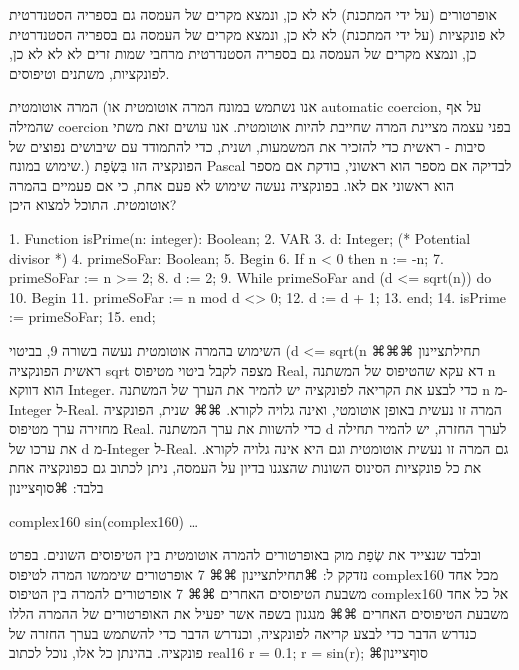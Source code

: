       אופרטורים
      (על ידי המתכנת)
      לא
      לא
      כן, ונמצא מקרים של העמסה גם בספריה הסטנדרטית
      לא
      פונקציות
      (על ידי המתכנת)
      לא
      לא
      כן, ונמצא מקרים של העמסה גם בספריה הסטנדרטית
      כן, ונמצא מקרים של העמסה גם בספריה הסטנדרטית
      מרחבי שמות זרים
      לא
      לא
      לא
      כן, לפונקציות, משתנים וטיפוסים.

      המרה אוטומטית
      (אנו נשתמש במונח המרה אוטומטית או automatic coercion, על אף שהמילה coercion בפני עצמה מציינת המרה שחייבת להיות אוטומטית. אנו עושים זאת משתי סיבות - ראשית כדי להזכיר את המשמעות, ושנית, כדי להתמודד עם שיבושים נפוצים של שימוש במונח.)
      הפונקציה הזו בִּשְׂפַת Pascal לבדיקה אם מספר הוא ראשוני, בודקת אם מספר הוא ראשוני אם לאו. בפונקציה נעשה שימוש לא פעם אחת, כי אם פעמיים בהמרה אוטומטית. התוכל למצוא היכן?

      1. Function isPrime(n: integer): Boolean;
      2. VAR
      3. d: Integer; (* Potential divisor *)
      4. primeSoFar: Boolean;
      5. Begin
      6. If n < 0 then n := -n;
      7. primeSoFar := n >= 2;
      8. d := 2;
      9. While primeSoFar and (d <= sqrt(n)) do
      10. Begin
      11. primeSoFar := n mod d <> 0;
      12. d := d + 1;
      13. end;
      14. isPrime := primeSoFar;
      15. end;

      השימוש בהמרה אוטומטית נעשה בשורה 9, בביטוי
      (d <= sqrt(n
      ⌘תחילת{ציינון}
      ⌘⌘ ראשית הפונקציה sqrt מצפה לקבל ביטוי מטיפוס Real, דא עקא שהטיפוס של המשתנה n הוא דווקא Integer. כדי לבצע את הקריאה לפונקציה יש להמיר את הערך של המשתנה n מ-Integer ל-Real. המרה זו נעשית באופן אוטומטי, ואינה גלויה לקורא.
      ⌘⌘ שנית, הפונקציה מחזירה ערך מטיפוס Real. כדי להשוות את ערך המשתנה d לערך החזרה, יש להמיר תחילה את ערכו של d מ-Integer ל-Real. גם המרה זו נעשית אוטומטית וגם היא אינה גלויה לקורא.
      את כל פונקציות הסינוס השונות שהצגנו בדיון על העמסה, ניתן לכתוב גם כפונקציה אחת בלבד:
  ⌘סוף{ציינון}

      complex160 sin(complex160) { … }

      ובלבד שנצייד את שְׂפַת מוק באופרטורים להמרה אוטומטית בין הטיפוסים השונים.
      בפרט נזדקק ל:
      ⌘תחילת{ציינון}
      ⌘⌘ 7 אופרטורים שיממשו המרה לטיפוס complex160 מכל אחד משבעת הטיפוסים האחרים
      ⌘⌘ 7 אופרטורים להמרה בין הטיפוס complex160 אל כל אחד משבעת הטיפוסים האחרים
      ⌘⌘ מנגנון בשפה אשר יפעיל את האופרטורים של ההמרה הללו כנדרש הדבר כדי לבצע קריאה לפונקציה, וכנדרש הדבר כדי להשתמש בערך החזרה של פונקציה.
      בהינתן כל אלו, נוכל לכתוב
      real16 r = 0.1;
      r = sin(r);
  ⌘סוף{ציינון}

